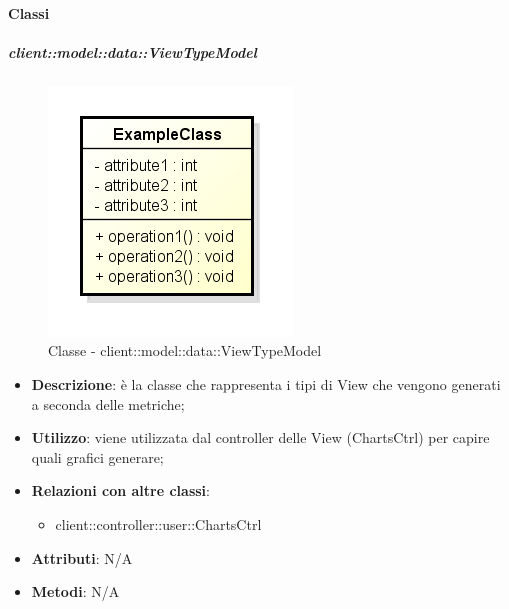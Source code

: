 	\paragraph{Classi} %
		\subparagraph{client::model::data::ViewTypeModel} %
		\label{subp:client_model_data_viewtypemodel}
			\begin{figure}[htbp]
				\centering
				\centerline{\includegraphics[scale=0.7]{./images/client/classes/example_class.png}}
				\caption{Classe - client::model::data::ViewTypeModel}
			\end{figure}
			\begin{itemize}
				\item \textbf{Descrizione}: è la classe che rappresenta i tipi di View che vengono generati a seconda delle metriche;
				\item \textbf{Utilizzo}: viene utilizzata dal controller delle View (ChartsCtrl) per capire quali grafici generare;
				\item \textbf{Relazioni con altre classi}:
					\begin{itemize}
						\item client::controller::user::ChartsCtrl
					\end{itemize}
				\item \textbf{Attributi}: N/A
				\item \textbf{Metodi}: N/A
			\end{itemize}

